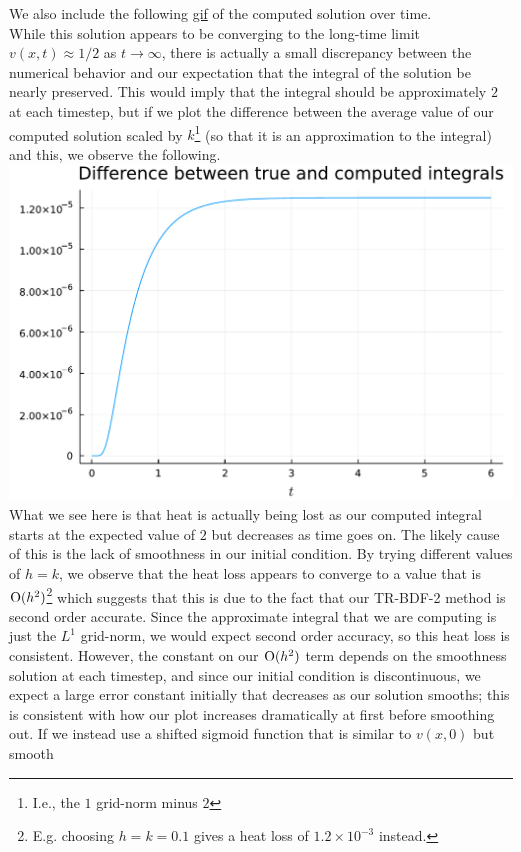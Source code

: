 \documentclass{article}
\begin{document}
We also include the following \href{https://imgur.com/a/E9uNlVp}{gif} of the computed solution over time.\\
While this solution appears to be converging to the long-time limit \(v(x,t) \approx 1/2\) as \(t \to \infty\), there is actually a small discrepancy between the numerical behavior and our expectation that the integral of the solution be nearly preserved. This would imply that the integral should be approximately $2$ at each timestep, but if we plot the difference between the average value of our computed solution scaled by $k$\footnote{I.e., the $1$ grid-norm minus $2$} (so that it is an approximation to the integral) and this, we observe the following.\\
\includegraphics[scale=0.5]{prob3_discrep.pdf}\\
What we see here is that heat is actually being lost as our computed integral starts at the expected value of $2$ but decreases as time goes on. The likely cause of this is the lack of smoothness in our initial condition. By trying different values of $h=k$, we observe that the heat loss appears to converge to a value that is $\operatorname{O}(h^2)$\footnote{E.g. choosing $h=k=0.1$ gives a heat loss of $1.2\times 10^{-3}$ instead.} which suggests that this is due to the fact that our TR-BDF-2 method is second order accurate. Since the approximate integral that we are computing is just the $L^1$ grid-norm, we would expect second order accuracy, so this heat loss is consistent. However, the constant on our $\operatorname{O}(h^2)$ term depends on the smoothness solution at each timestep, and since our initial condition is discontinuous, we expect a large error constant initially that decreases as our solution smooths; this is consistent with how our plot increases dramatically at first before smoothing out. If we instead use a shifted sigmoid function that is similar to $v(x,0)$ but smooth
\end{document}
